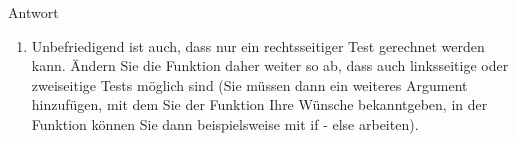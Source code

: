\documentclass[
]{book}
\newenvironment{Shaded}{\begin{snugshade}}{\end{snugshade}}
\newcommand{\AttributeTok}[1]{\textcolor[rgb]{0.77,0.63,0.00}{#1}}
\newcommand{\ControlFlowTok}[1]{\textcolor[rgb]{0.13,0.29,0.53}{\textbf{#1}}}
\newcommand{\DecValTok}[1]{\textcolor[rgb]{0.00,0.00,0.81}{#1}}
\newcommand{\FunctionTok}[1]{\textcolor[rgb]{0.00,0.00,0.00}{#1}}
\newcommand{\NormalTok}[1]{#1}
\newcommand{\OtherTok}[1]{\textcolor[rgb]{0.56,0.35,0.01}{#1}}
\newcommand{\SpecialCharTok}[1]{\textcolor[rgb]{0.00,0.00,0.00}{#1}}
\providecommand{\tightlist}{%
  \setlength{\itemsep}{0pt}\setlength{\parskip}{0pt}}
\begin{document}
Antwort

\begin{Shaded}
\end{Shaded}

\begin{enumerate}
\def\labelenumi{(\arabic{enumi})}
\setcounter{enumi}{3}
\tightlist
\item
  Unbefriedigend ist auch, dass nur ein rechtsseitiger Test gerechnet werden kann. Ändern Sie die Funktion daher weiter so ab, dass auch linksseitige oder zweiseitige Tests möglich sind (Sie müssen dann ein weiteres Argument hinzufügen, mit dem Sie der Funktion Ihre Wünsche bekanntgeben, in der Funktion können Sie dann beispielsweise mit if - else arbeiten).
\end{enumerate}
\end{document}
